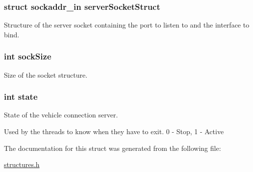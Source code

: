 \subsubsection[{\texorpdfstring{server\+Socket\+Struct}{serverSocketStruct}}]{\setlength{\rightskip}{0pt plus 5cm}struct sockaddr\+\_\+in server\+Socket\+Struct}\hypertarget{struct_v_s_c___s_t_a_t_aa6596d8b411e7221fd256518fe443060}{}\label{struct_v_s_c___s_t_a_t_aa6596d8b411e7221fd256518fe443060}


Structure of the server socket containing the port to listen to and the interface to bind. 

\subsubsection[{\texorpdfstring{sock\+Size}{sockSize}}]{\setlength{\rightskip}{0pt plus 5cm}int sock\+Size}\hypertarget{struct_v_s_c___s_t_a_t_a67eae050a73c271691a9fb1280b4b358}{}\label{struct_v_s_c___s_t_a_t_a67eae050a73c271691a9fb1280b4b358}


Size of the socket structure. 

\subsubsection[{\texorpdfstring{state}{state}}]{\setlength{\rightskip}{0pt plus 5cm}int state}\hypertarget{struct_v_s_c___s_t_a_t_a89f234133d3efe315836311cbf21c64b}{}\label{struct_v_s_c___s_t_a_t_a89f234133d3efe315836311cbf21c64b}


State of the vehicle connection server. 

Used by the threads to know when they have to exit. 0 -\/ Stop, 1 -\/ Active 

The documentation for this struct was generated from the following file\+:\begin{DoxyCompactItemize}
\item 
\hyperlink{structures_8h}{structures.\+h}\end{DoxyCompactItemize}
